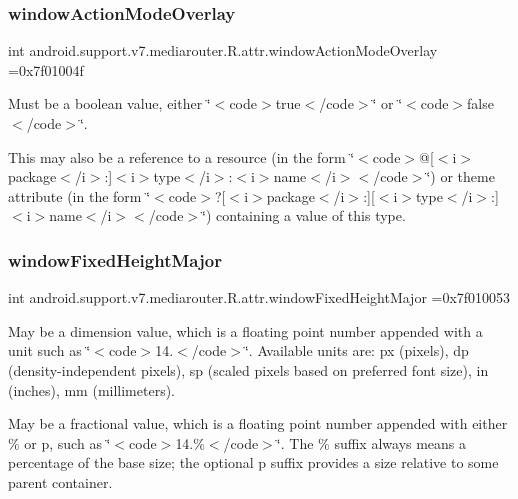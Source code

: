 \subsubsection{\texorpdfstring{window\+Action\+Mode\+Overlay}{windowActionModeOverlay}}
{\footnotesize\ttfamily int android.\+support.\+v7.\+mediarouter.\+R.\+attr.\+window\+Action\+Mode\+Overlay =0x7f01004f\hspace{0.3cm}{\ttfamily [static]}}

Must be a boolean value, either \char`\"{}$<$code$>$true$<$/code$>$\char`\"{} or \char`\"{}$<$code$>$false$<$/code$>$\char`\"{}. 

This may also be a reference to a resource (in the form \char`\"{}$<$code$>$@\mbox{[}$<$i$>$package$<$/i$>$\+:\mbox{]}$<$i$>$type$<$/i$>$\+:$<$i$>$name$<$/i$>$$<$/code$>$\char`\"{}) or theme attribute (in the form \char`\"{}$<$code$>$?\mbox{[}$<$i$>$package$<$/i$>$\+:\mbox{]}\mbox{[}$<$i$>$type$<$/i$>$\+:\mbox{]}$<$i$>$name$<$/i$>$$<$/code$>$\char`\"{}) containing a value of this type. \mbox{\label{classandroid_1_1support_1_1v7_1_1mediarouter_1_1R_1_1attr_ae94c6a494cc42532fa3c754e8ed28b40}} 
\subsubsection{\texorpdfstring{window\+Fixed\+Height\+Major}{windowFixedHeightMajor}}
{\footnotesize\ttfamily int android.\+support.\+v7.\+mediarouter.\+R.\+attr.\+window\+Fixed\+Height\+Major =0x7f010053\hspace{0.3cm}{\ttfamily [static]}}

May be a dimension value, which is a floating point number appended with a unit such as \char`\"{}$<$code$>$14.\+5sp$<$/code$>$\char`\"{}. Available units are\+: px (pixels), dp (density-\/independent pixels), sp (scaled pixels based on preferred font size), in (inches), mm (millimeters). 

May be a fractional value, which is a floating point number appended with either \% or p, such as \char`\"{}$<$code$>$14.\%$<$/code$>$\char`\"{}. The \% suffix always means a percentage of the base size; the optional p suffix provides a size relative to some parent container. 

